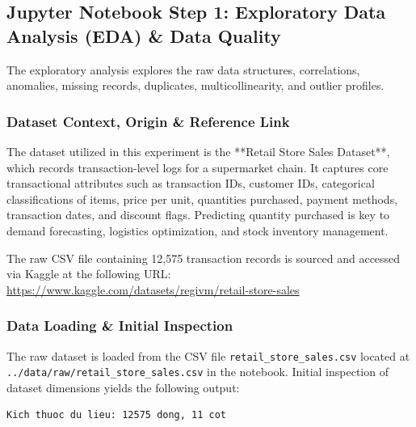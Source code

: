 \documentclass[12pt,a4paper]{article}
\begin{document}
\subsection{Jupyter Notebook Step 1: Exploratory Data Analysis (EDA) \& Data Quality}
The exploratory analysis explores the raw data structures, correlations, anomalies, missing records, duplicates, multicollinearity, and outlier profiles.

\subsubsection{Dataset Context, Origin \& Reference Link}
The dataset utilized in this experiment is the **Retail Store Sales Dataset**, which records transaction-level logs for a supermarket chain. It captures core transactional attributes such as transaction IDs, customer IDs, categorical classifications of items, price per unit, quantities purchased, payment methods, transaction dates, and discount flags. Predicting quantity purchased is key to demand forecasting, logistics optimization, and stock inventory management.

The raw CSV file containing 12,575 transaction records is sourced and accessed via Kaggle at the following URL: \\
\url{https://www.kaggle.com/datasets/regivm/retail-store-sales}

\subsubsection{Data Loading \& Initial Inspection}
The raw dataset is loaded from the CSV file \texttt{retail\_store\_sales.csv} located at \texttt{../data/raw/retail\_store\_sales.csv} in the notebook. Initial inspection of dataset dimensions yields the following output:
\begin{verbatim}
Kich thuoc du lieu: 12575 dong, 11 cot
\end{verbatim}
\end{document}
